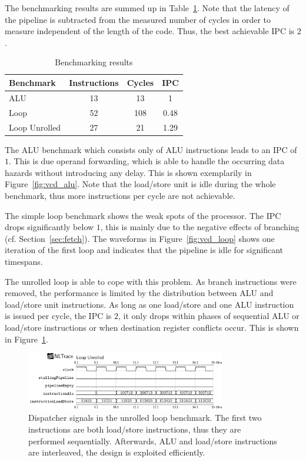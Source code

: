 \documentclass[conference]{IEEEtran}
\begin{document}
The benchmarking results are summed up in Table~\ref{tab:results}. Note that the latency of the pipeline is subtracted from the measured number of cycles in order to measure independent of the length of the code. Thus, the best achievable IPC is $2$.

\begin{table} [h]
	\caption{Benchmarking results}
	\centering
	\begin{tabular}{l c c c}
			Benchmark & Instructions & Cycles & IPC \\
		\midrule
			ALU & 13 & 13 & 1 \\
			Loop & 52 & 108 & 0.48 \\
			Loop Unrolled & 27 & 21 & 1.29
	\end{tabular}
	\label{tab:results}
\end{table}


The ALU benchmark which consists only of ALU instructions leads to an IPC of $1$. This is due operand forwarding, which is able to handle the occurring data hazards without introducing any delay. This is shown exemplarily in Figure~\ref{fig:vcd_alu}. Note that the load/store unit is idle during the whole benchmark, thus more instructions per cycle are not achievable. 


The simple loop benchmark shows the weak spots of the processor. The IPC drops significantly below $1$, this is mainly due to the negative effects of branching (cf. Section~\ref{sec:fetch}). The waveforms in Figure~\ref{fig:vcd_loop} shows one iteration of the first loop and indicates that the pipeline is idle for significant timespans.

The unrolled loop is able to cope with this problem. As branch instructions were removed, the performance is limited by the distribution between ALU and load/store unit instructions. As long as one load/store and one ALU instruction is issued per cycle, the IPC is $2$, it only drops within phases of sequential ALU or load/store instructions or when destination register conflicts occur. This is shown in Figure~\ref{fig:vcd_loop_unrolled}.

\begin{figure}
	\centering
	\includegraphics[width=8.7cm]{vcd_loop_unrolled.png}
	\caption{Dispatcher signals in the unrolled loop benchmark. The first two instructions are both load/store instructions, thus they are performed sequentially. Afterwards, ALU and load/store instructions are interleaved, the design is exploited efficiently.}
	\label{fig:vcd_loop_unrolled}
\end{figure}
\end{document}
